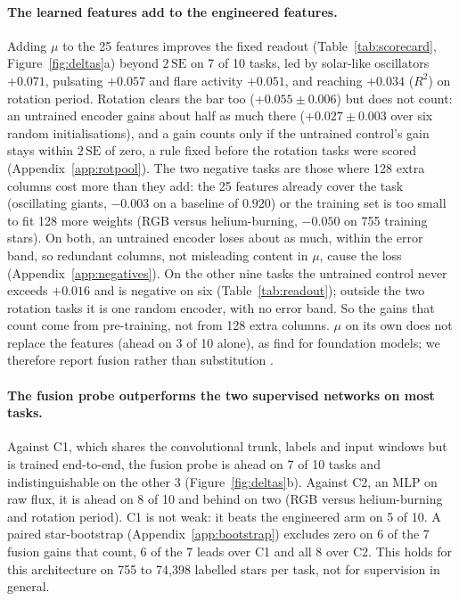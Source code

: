 \documentclass{article}
\begin{document}
\paragraph{The learned features add to the engineered features.} Adding $\mu$ to the 25 features
improves the fixed readout (Table~\ref{tab:scorecard}, Figure~\ref{fig:deltas}a) beyond $2\,\mathrm{SE}$ on 7 of 10 tasks, led by solar-like oscillators $+0.071$,
pulsating $+0.057$ and flare activity $+0.051$, and reaching $+0.034$ ($R^{2}$) on rotation period.
Rotation clears the bar too ($+0.055 \pm 0.006$) but does not count: an untrained encoder gains
about half as much there ($+0.027 \pm 0.003$ over six random initialisations), and a gain counts
only if the untrained control's gain stays within $2\,\mathrm{SE}$ of zero, a rule fixed before the
rotation tasks were scored (Appendix~\ref{app:rotpool}). The two negative tasks are those where 128 extra columns cost more
than they add: the 25 features already cover the task (oscillating giants, $-0.003$ on a baseline
of $0.920$) or the training set is too small to fit 128 more weights (RGB versus helium-burning, $-0.050$ on
755 training stars). On both, an untrained encoder loses about as much, within the error band, so
redundant columns, not misleading content in $\mu$, cause the loss (Appendix~\ref{app:negatives}). On the
other nine tasks the untrained control never exceeds $+0.016$ and is negative on six
(Table~\ref{tab:readout}); outside the two rotation tasks it is one random encoder, with no error
band. So the gains that count come from
pre-training, not from 128 extra columns. $\mu$ on its own does not
replace the features (ahead on 3 of 10 alone), as \citet{li2025staremb} find for
foundation models; we therefore report fusion rather than substitution \citep{makinen2024}.

\paragraph{The fusion probe outperforms the two supervised networks on most tasks.} Against C1, which shares
the convolutional trunk, labels and input windows but is trained end-to-end, the fusion
probe is ahead on 7 of 10 tasks and indistinguishable on the other 3
(Figure~\ref{fig:deltas}b). Against
C2, an MLP on raw flux, it is ahead on 8 of 10 and behind on two (RGB versus helium-burning and
rotation period). C1 is not weak: it beats the engineered arm on 5 of 10.
A paired star-bootstrap (Appendix~\ref{app:bootstrap}) excludes zero on 6 of the 7 fusion gains that
count, 6 of the 7 leads over C1 and all 8 over C2.
This holds for this architecture on 755 to 74{,}398 labelled stars per task, not for
supervision in general.
\end{document}
